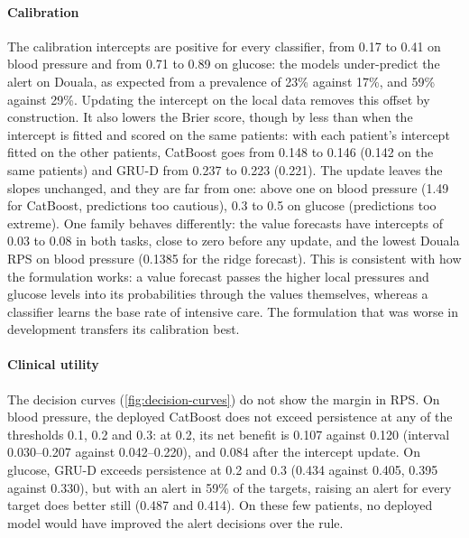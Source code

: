 \paragraph{Calibration} The calibration intercepts are positive for every classifier, from 0.17 to 0.41 on blood pressure and from 0.71 to 0.89 on glucose: the models under-predict the alert on Douala, as expected from a prevalence of 23\% against 17\%, and 59\% against 29\%. Updating the intercept on the local data removes this offset by construction. It also lowers the Brier score, though by less than when the intercept is fitted and scored on the same patients: with each patient's intercept fitted on the other patients, CatBoost goes from 0.148 to 0.146 (0.142 on the same patients) and GRU-D from 0.237 to 0.223 (0.221). The update leaves the slopes unchanged, and they are far from one: above one on blood pressure (1.49 for CatBoost, predictions too cautious), 0.3 to 0.5 on glucose (predictions too extreme). One family behaves differently: the value forecasts have intercepts of 0.03 to 0.08 in both tasks, close to zero before any update, and the lowest Douala RPS on blood pressure (0.1385 for the ridge forecast). This is consistent with how the formulation works: a value forecast passes the higher local pressures and glucose levels into its probabilities through the values themselves, whereas a classifier learns the base rate of intensive care. The formulation that was worse in development transfers its calibration best.

\paragraph{Clinical utility} The decision curves (\cref{fig:decision-curves}) do not show the margin in RPS. On blood pressure, the deployed CatBoost does not exceed persistence at any of the thresholds 0.1, 0.2 and 0.3: at 0.2, its net benefit is 0.107 against 0.120 (interval 0.030--0.207 against 0.042--0.220), and 0.084 after the intercept update. On glucose, GRU-D exceeds persistence at 0.2 and 0.3 (0.434 against 0.405, 0.395 against 0.330), but with an alert in 59\% of the targets, raising an alert for every target does better still (0.487 and 0.414). On these few patients, no deployed model would have improved the alert decisions over the rule.

